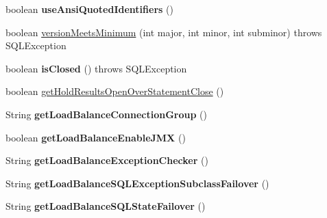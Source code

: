 \begin{DoxyCompactItemize}
boolean {\bfseries use\+Ansi\+Quoted\+Identifiers} ()
\item 
boolean \mbox{\hyperlink{classcom_1_1mysql_1_1jdbc_1_1_multi_host_my_s_q_l_connection_a8e2a15f4a6eef23983bff753a54c0911}{version\+Meets\+Minimum}} (int major, int minor, int subminor)  throws S\+Q\+L\+Exception 
\item 
\mbox{\label{classcom_1_1mysql_1_1jdbc_1_1_multi_host_my_s_q_l_connection_acbf8408f5b12de053c1c9e670f271977}} 
boolean {\bfseries is\+Closed} ()  throws S\+Q\+L\+Exception 
\item 
boolean \mbox{\hyperlink{classcom_1_1mysql_1_1jdbc_1_1_multi_host_my_s_q_l_connection_a7dd4373e730d9de2a0a47b5670e157ef}{get\+Hold\+Results\+Open\+Over\+Statement\+Close}} ()
\item 
\mbox{\label{classcom_1_1mysql_1_1jdbc_1_1_multi_host_my_s_q_l_connection_ae781e11bfc3675b597c08c87e97eea1a}} 
String {\bfseries get\+Load\+Balance\+Connection\+Group} ()
\item 
\mbox{\label{classcom_1_1mysql_1_1jdbc_1_1_multi_host_my_s_q_l_connection_a94ec719fe255b615c265da864f6937e6}} 
boolean {\bfseries get\+Load\+Balance\+Enable\+J\+MX} ()
\item 
\mbox{\label{classcom_1_1mysql_1_1jdbc_1_1_multi_host_my_s_q_l_connection_a5d8cf153d3d96f56a367da10606d0af8}} 
String {\bfseries get\+Load\+Balance\+Exception\+Checker} ()
\item 
\mbox{\label{classcom_1_1mysql_1_1jdbc_1_1_multi_host_my_s_q_l_connection_aee067f22e29285e7952a4866a922a87c}} 
String {\bfseries get\+Load\+Balance\+S\+Q\+L\+Exception\+Subclass\+Failover} ()
\item 
\mbox{\label{classcom_1_1mysql_1_1jdbc_1_1_multi_host_my_s_q_l_connection_ad869be80cf7f9f41dc5e1a8979b0cd71}} 
String {\bfseries get\+Load\+Balance\+S\+Q\+L\+State\+Failover} ()
\item 
\mbox{\label{classcom_1_1mysql_1_1jdbc_1_1_multi_host_my_s_q_l_connection_ac5f5d094fc0a7bc32b663a819535a8bf}} 

\end{DoxyCompactItemize}
